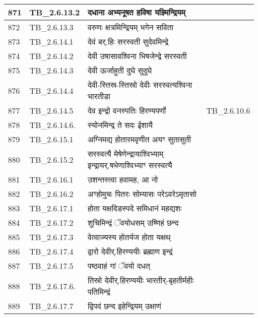 \documentclass[17pt]{extarticle}
\begin{document}
\begin{longtable}{||p{0.4in}||p{0.9in}||p{4.0in}||p{0.9in}||}
        \hline
            871 & TB\_2.6.13.2 & दधाना अभ्यनूषत हविषा यज्ञ्मिन्द्रियम् &      \\
        \hline
            872 & TB\_2.6.13.3 & वरुणः क्षत्रमिन्द्रियम् भगेन सविता &      \\
        \hline
            873 & TB\_2.6.14.1 & देवं बर्.हिः सरस्वती सुदेवमिन्द्रे &      \\
        \hline
            874 & TB\_2.6.14.2 & देवी उषासावश्विना भिषजेन्द्रे सरस्वती &      \\
        \hline
            875 & TB\_2.6.14.3 & देवी ऊर्जाहुती दुघे सुदुघे &      \\
        \hline
            876 & TB\_2.6.14.4 & देवी{-}स्तिस्र{-}स्तिस्रो देवीः सरस्वत्यश्विना भारतीडा &      \\
        \hline
            877 & TB\_2.6.14.5 & देव इन्द्रो वनस्पतिः हिरण्यपर्णो & TB\_2.6.10.6        \\
        \hline
            878 & TB\_2.6.14.6. & स्योनमिन्द्र ते सदः ईशायै &      \\
        \hline
            879 & TB\_2.6.15.1 & अग्निमद्य होतारमवृणीत अयꣳ सुतासुती &      \\
        \hline
            880 & TB\_2.6.15.2 & सरस्वत्यै मेषेणेन्द्रायाश्विभ्याम् इन्द्रायर्.षभेणाश्विभ्याꣳ सरस्वत्यै &      \\
        \hline
            881 & TB\_2.6.16.1 & उशन्तस्त्वा हवामह, आ नो &      \\
        \hline
            882 & TB\_2.6.16.2 & अꣳहोमुचः पितरः सोम्यासः परेऽवरेऽमृतासो &      \\
        \hline
            883 & TB\_2.6.17.1 & होता यक्षदिडस्पदे समिधानं महद्यशः &      \\
        \hline
            884 & TB\_2.6.17.2 & शुचिमिन्द्रं ॅवयोधसम् उष्णिहं छन्द &      \\
        \hline
            885 & TB\_2.6.17.3 & वेत्वाज्यस्य होतर्यज होता यक्षथ् &      \\
        \hline
            886 & TB\_2.6.17.4 & द्वारो देवीर्.हिरण्ययीः ब्रह्माण इन्द्रं &      \\
        \hline
            887 & TB\_2.6.17.5 & पष्ठवाहं गां ॅवयो दधत् &      \\
        \hline
            888 & TB\_2.6.17.6. & तिस्रो देवीर्.हिरण्ययीः भारतीर्{-}बृहतीर्महीः पतिमिन्द्रं &      \\
        \hline
            889 & TB\_2.6.17.7 & द्विपदं छन्द इहेन्द्रियम् उक्षाणं &      \\
        \hline

\end{longtable}
\end{document}
